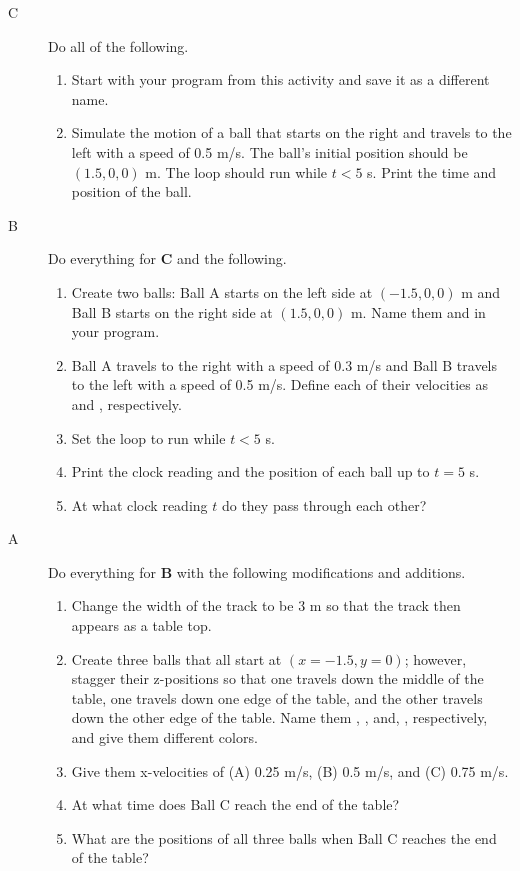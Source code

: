 \begin{description}

\item[C] Do all of the following.
\begin{enumerate}
	\item Start with your program from this activity and save it as a different name.
	\item Simulate the motion of a ball that starts on the right and travels to the left with a speed of 0.5 m/s. The ball's initial position should be $(1.5,0,0)$ m. The  loop should run while $t<5$ s. Print the time and position of the ball.
\end{enumerate}

\item[B] Do everything for {\bf C} and the following.

\begin{enumerate}
	\item Create two balls:  Ball A starts on the left side at $(-1.5,0,0)$ m and Ball B starts on the right side at  $(1.5,0,0)$ m. Name them  and  in your program.
	\item Ball A travels to the right with a speed of 0.3 m/s and Ball B travels to the left with a speed of 0.5 m/s. Define each of their velocities as  and , respectively.
	\item Set the  loop to run while $t<5$ s. 
	\item Print the clock reading  and the position of each ball up to $t=5$ s.
	\item At what clock reading $t$ do they pass through each other?
\end{enumerate}

\item[A] Do everything for {\bf B} with the following modifications and additions.

\begin{enumerate}
	\item Change the width of the track to be 3 m so that the track then appears as a table top.
	\item Create three balls that all start at $(x=-1.5, y=0)$; however, stagger their z-positions so that one travels down the middle of the table, one travels down one edge of the table, and the other travels down the other edge of the table. Name them , , and, , respectively, and give them different colors.
	\item Give them x-velocities of (A) 0.25 m/s, (B) 0.5 m/s, and (C) 0.75 m/s.
	\item At what time does Ball C reach the end of the table?
	\item What are the positions of all three balls when Ball C reaches the end of the table?
\end{enumerate}

\end{description}

